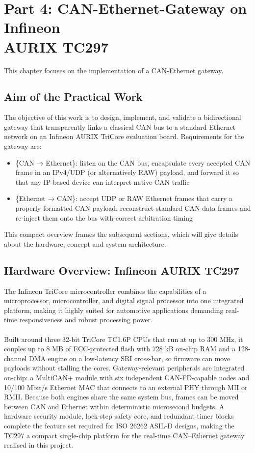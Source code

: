 \newpage 
\section{Part 4: CAN-Ethernet-Gateway on Infineon \\AURIX TC297}\label{sec:can-gateway}

This chapter focuses on the implementation of a CAN-Ethernet gateway.

\subsection{Aim of the Practical Work}
The objective of this work is to design, implement, and validate a bidirectional gateway that transparently links a classical CAN bus to a standard Ethernet network on an Infineon AURIX TriCore evaluation board. Requirements for the gateway are:
\begin{itemize}
\item \{CAN → Ethernet\}: listen on the CAN bus, encapsulate every accepted CAN frame in an IPv4/UDP (or alternatively RAW) payload, and forward it so that any IP-based device can interpret native CAN traffic
\item \{Ethernet → CAN\}: accept UDP or RAW Ethernet frames that carry a properly formatted CAN payload, reconstruct standard CAN data frames and re-inject them onto the bus with correct arbitration timing
\end{itemize}
This compact overview frames the subsequent sections, which will give details about the hardware, concept and system architecture. 
\subsection{Hardware Overview: Infineon AURIX TC297}
The Infineon TriCore microcontroller combines the capabilities of a microprocessor, microcontroller, and digital signal processor into one integrated platform, making it highly suited for automotive applications demanding real-time responsiveness and robust processing power.\\\\
Built around three 32-bit TriCore TC1.6P CPUs that run at up to 300 MHz, it couples up to 8 MB of ECC-protected flash with 728 kB on-chip RAM and a 128-channel DMA engine on a low-latency SRI cross-bar, so firmware can move payloads without stalling the cores. Gateway-relevant peripherals are integrated on-chip: a MultiCAN+ module with six independent CAN-FD-capable nodes and 10/100 Mbit/s Ethernet MAC that connects to an external PHY through MII or RMII. Because both engines share the same system bus, frames can be moved between CAN and Ethernet within deterministic microsecond budgets. A hardware security module, lock-step safety core, and redundant timer blocks complete the feature set required for ISO 26262 ASIL-D designs, making the TC297 a compact single-chip platform for the real-time CAN–Ethernet gateway realised in this project\cite{infineon}.

